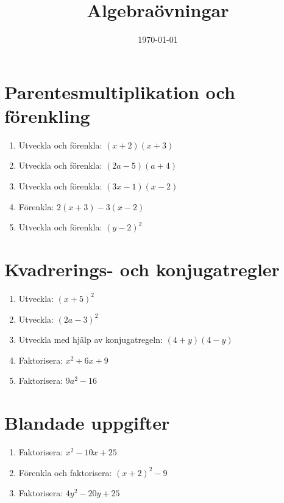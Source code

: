 \documentclass[a4paper,11pt]{article}
\title{Algebraövningar}
\author{}
\date{\today}
\begin{document}
\maketitle

\section{Parentesmultiplikation och förenkling}

\begin{enumerate}[label=\textbf{\arabic*.}]
    \item Utveckla och förenkla: $(x + 2)(x + 3)$
    \item Utveckla och förenkla: $(2a - 5)(a + 4)$
    \item Utveckla och förenkla: $(3x - 1)(x - 2)$
    \item Förenkla: $2(x + 3) - 3(x - 2)$
    \item Utveckla och förenkla: $(y - 2)^2$
\end{enumerate}

\section{Kvadrerings- och konjugatregler}

\begin{enumerate}[label=\textbf{\arabic*.}]
    \item Utveckla: $(x + 5)^2$
    \item Utveckla: $(2a - 3)^2$
    \item Utveckla med hjälp av konjugatregeln: $(4 + y)(4 - y)$
    \item Faktorisera: $x^2 + 6x + 9$
    \item Faktorisera: $9a^2 - 16$
\end{enumerate}

\section{Blandade uppgifter}

\begin{enumerate}[label=\textbf{\arabic*.}]
    \item Faktorisera: $x^2 - 10x + 25$
    \item Förenkla och faktorisera: $(x + 2)^2 - 9$
    \item Faktorisera: $4y^2 - 20y + 25$
\end{enumerate}
\end{document}

